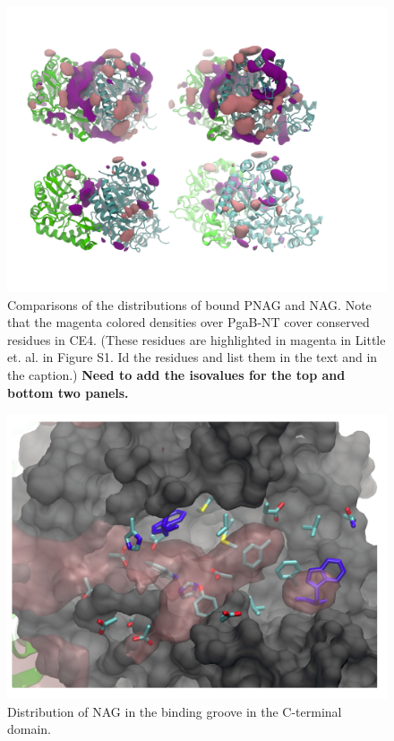 \begin{figure}[htbp]
\centering
\includegraphics[width=7in]{figures/results4/pnag_nag_sdf_zoomedout.png}
\caption{Comparisons of the distributions of bound PNAG and NAG. Note that the magenta colored densities over PgaB-NT cover conserved residues in CE4.  (These residues are highlighted in magenta in Little et. al. in Figure S1. Id the residues and list them in the text and in the caption.) \textbf{Need to add the isovalues for the top and bottom two panels.}}
\label{fig:pnag_nag_overlapped_zoomedout}
\end{figure}

\begin{figure}[htbp]
\centering
\includegraphics[width=6.23in]{figures/results4/nag_cterminal_zoomedin.png}
\caption{Distribution of NAG in the binding groove in the C-terminal domain.}
\label{fig:nag_cterminal_zoomedin}
\end{figure}


